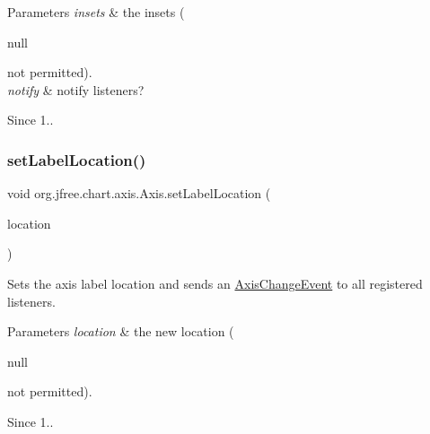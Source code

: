 \begin{DoxyParams}{Parameters}
{\em insets} & the insets (
\begin{DoxyCode}
null 
\end{DoxyCode}
 not permitted). \\
\hline
{\em notify} & notify listeners?\\
\hline
\end{DoxyParams}
\begin{DoxySince}{Since}
1.. 
\end{DoxySince}
\mbox{\label{classorg_1_1jfree_1_1chart_1_1axis_1_1_axis_ad7787def8b9ce66d0d7c36f2600efe68}} 
\subsubsection{\texorpdfstring{set\+Label\+Location()}{setLabelLocation()}}
{\footnotesize\ttfamily void org.\+jfree.\+chart.\+axis.\+Axis.\+set\+Label\+Location (\begin{DoxyParamCaption}\item[{\mbox{\hyperlink{classorg_1_1jfree_1_1chart_1_1axis_1_1_axis_label_location}{Axis\+Label\+Location}}}]{location }\end{DoxyParamCaption})}

Sets the axis label location and sends an \mbox{\hyperlink{}{Axis\+Change\+Event}} to all registered listeners.


\begin{DoxyParams}{Parameters}
{\em location} & the new location (
\begin{DoxyCode}
null 
\end{DoxyCode}
 not permitted).\\
\hline
\end{DoxyParams}
\begin{DoxySince}{Since}
1.. 
\end{DoxySince}
\mbox{\label{classorg_1_1jfree_1_1chart_1_1axis_1_1_axis_a68eeb531bf1f73ff8b0d4aa12ed54a1a}} 
